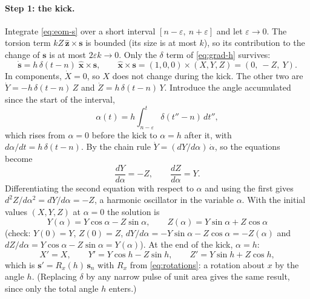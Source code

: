 \documentclass[11pt,a4paper]{article}
\newcommand{\vs}{\bm{s}}
\begin{document}
\paragraph{Step 1: the kick.} Integrate \eqref{eq:eom-s} over a short interval $[n-\varepsilon,\ n+\varepsilon]$
and let $\varepsilon\to0$. The torsion term $kZ\,\hat{\bm z}\times\vs$ is bounded (its size is at most $k$), so
its contribution to the change of $\vs$ is at most $2\varepsilon k \to 0$. Only the $\delta$ term of
\eqref{eq:grad-h} survives:
\begin{equation*}
  \dot{\vs} = h\,\delta(t-n)\;\hat{\bm x}\times\vs, \qquad \hat{\bm x}\times\vs = (1,0,0)\times(X,Y,Z) = (0,\ -Z,\ Y).
\end{equation*}
In components, $\dot X = 0$, so $X$ does not change during the kick. The other two are
$\dot Y = -h\,\delta(t-n)\,Z$ and $\dot Z = h\,\delta(t-n)\,Y$. Introduce the angle accumulated since the start of
the interval,
\begin{equation*}
  \alpha(t) = h\int_{n-\varepsilon}^{t}\delta(t''-n)\,dt'' ,
\end{equation*}
which rises from $\alpha = 0$ before the kick to $\alpha = h$ after it, with $d\alpha/dt = h\,\delta(t-n)$. By the
chain rule $\dot Y = (dY/d\alpha)\,\dot\alpha$, so the equations become
\begin{equation*}
  \frac{dY}{d\alpha} = -Z, \qquad \frac{dZ}{d\alpha} = Y .
\end{equation*}
Differentiating the second equation with respect to $\alpha$ and using the first gives $d^2Z/d\alpha^2 = dY/d\alpha =
-Z$, a harmonic oscillator in the variable $\alpha$. With the initial values $(X,Y,Z)$ at $\alpha = 0$ the solution is
\begin{equation*}
  Y(\alpha) = Y\cos\alpha - Z\sin\alpha, \qquad Z(\alpha) = Y\sin\alpha + Z\cos\alpha
\end{equation*}
(check: $Y(0) = Y$, $Z(0) = Z$, $dY/d\alpha = -Y\sin\alpha - Z\cos\alpha = -Z(\alpha)$ and $dZ/d\alpha = Y\cos\alpha -
Z\sin\alpha = Y(\alpha)$). At the end of the kick,
$\alpha = h$:
\begin{equation}\label{eq:rotation-x}
  X' = X, \qquad Y' = Y\cos h - Z\sin h, \qquad Z' = Y\sin h + Z\cos h ,
\end{equation}
which is $\vs' = R_x(h)\,\vs_n$ with $R_x$ from \eqref{eq:rotations}: a rotation about $x$ by the angle $h$.
(Replacing $\delta$ by any narrow pulse of unit area gives the same result, since only the total angle $h$ enters.)
\end{document}
